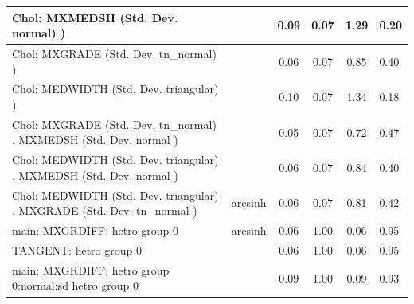 \begin{table}
\begin{center}
\begin{tabular}{|l|l|c|c|c|l|}
			\hline
			 Chol: MXMEDSH (Std. Dev. normal) ) &  & 0.09 & 0.07 & 1.29 & 0.20 \\
			\hline
			 Chol: MXGRADE (Std. Dev. tn_normal) ) &  & 0.06 & 0.07 & 0.85 & 0.40 \\
			\hline
			 Chol: MEDWIDTH (Std. Dev. triangular) ) &  & 0.10 & 0.07 & 1.34 & 0.18 \\
			\hline
			 Chol: MXGRADE (Std. Dev. tn_normal) . MXMEDSH (Std. Dev.   normal ) &  & 0.05 & 0.07 & 0.72 & 0.47 \\
			\hline
			 Chol: MEDWIDTH (Std. Dev. triangular) . MXMEDSH (Std. Dev.   normal ) &  & 0.06 & 0.07 & 0.84 & 0.40 \\
			\hline
			 Chol: MEDWIDTH (Std. Dev. triangular) . MXGRADE (Std. Dev.   tn_normal ) & arcsinh & 0.06 & 0.07 & 0.81 & 0.42 \\
			\hline
			main: MXGRDIFF: hetro group 0 & arcsinh & 0.06 & 1.00 & 0.06 & 0.95 \\
			\hline
			TANGENT: hetro group 0 &  & 0.06 & 1.00 & 0.06 & 0.95 \\
			\hline
			main: MXGRDIFF: hetro group 0:normal:sd  hetro group 0 &  & 0.09 & 1.00 & 0.09 & 0.93 \\
			\hline
		\end{tabular}
	\end{center}
\end{table}
